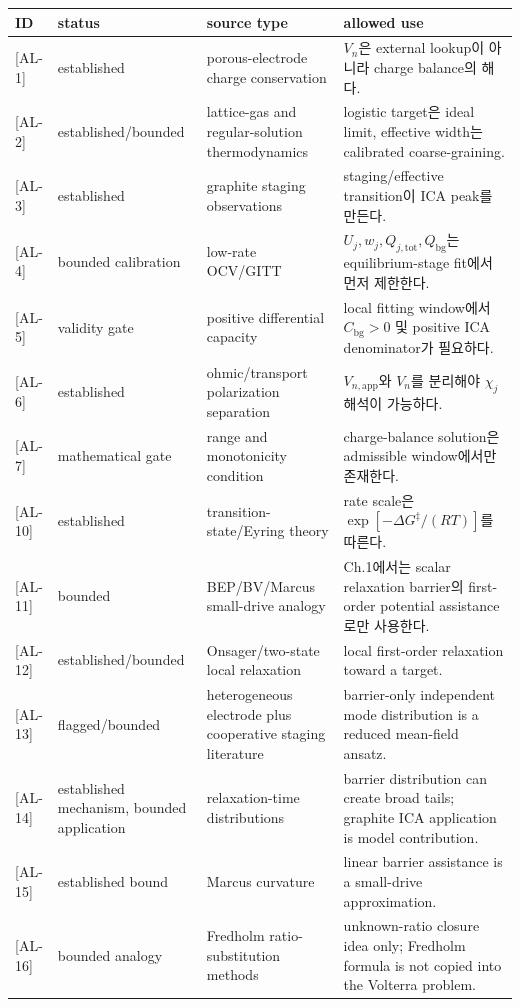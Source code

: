 \documentclass[11pt,a4paper]{article}
\newcommand{\app}{\mathrm{app}}
\newcommand{\bg}{\mathrm{bg}}
\newcommand{\tot}{\mathrm{tot}}
\newcommand{\AL}[1]{\textsf{[AL-#1]}}
\begin{document}
\begin{longtable}{p{} p{} p{} p{}}
\toprule ID & status & source type & allowed use \\ \midrule \endhead
\AL{1} & established & porous-electrode charge conservation \cite{doyle1993,newman} & $V_n$은 external lookup이 아니라 charge balance의 해다. \\
\AL{2} & established/bounded & lattice-gas and regular-solution thermodynamics \cite{mckinnon1983,bazant2013} & logistic target은 ideal limit, effective width는 calibrated coarse-graining. \\
\AL{3} & established & graphite staging observations \cite{dahn1991,ohzuku1993,funabiki1999ea,funabiki1999jes} & staging/effective transition이 ICA peak를 만든다. \\
\AL{4} & bounded calibration & low-rate OCV/GITT & $U_j,w_j,Q_{j,\tot},Q_{\bg}$는 equilibrium-stage fit에서 먼저 제한한다. \\
\AL{5} & validity gate & positive differential capacity & local fitting window에서 $C_{\bg}>0$ 및 positive ICA denominator가 필요하다. \\
\AL{6} & established & ohmic/transport polarization separation \cite{newman,bardfaulkner} & $V_{n,\app}$와 $V_n$를 분리해야 $\chi_j$ 해석이 가능하다. \\
\AL{7} & mathematical gate & range and monotonicity condition & charge-balance solution은 admissible window에서만 존재한다. \\
\AL{10} & established & transition-state/Eyring theory \cite{eyring1935} & rate scale은 $\exp[-\Delta G^\ddagger/(RT)]$를 따른다. \\
\AL{11} & bounded & BEP/BV/Marcus small-drive analogy \cite{evanspolanyi1938,bardfaulkner,marcus1956} & Ch.1에서는 scalar relaxation barrier의 first-order potential assistance로만 사용한다. \\
\AL{12} & established/bounded & Onsager/two-state local relaxation \cite{onsager1931,degrootmazur1962} & local first-order relaxation toward a target. \\
\AL{13} & flagged/bounded & heterogeneous electrode plus cooperative staging literature & barrier-only independent mode distribution is a reduced mean-field ansatz. \\
\AL{14} & established mechanism, bounded application & relaxation-time distributions \cite{svare2000,johnston2006,lindsey1980} & barrier distribution can create broad tails; graphite ICA application is model contribution. \\
\AL{15} & established bound & Marcus curvature \cite{marcus1956} & linear barrier assistance is a small-drive approximation. \\
\AL{16} & bounded analogy & Fredholm ratio-substitution methods \cite{lee2011,son2013,jcp2017} & unknown-ratio closure idea only; Fredholm formula is not copied into the Volterra problem. \\
\bottomrule
\end{longtable}
\end{document}
